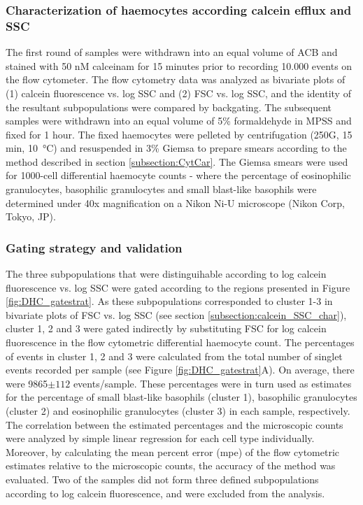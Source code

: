 \subsubsection{Characterization of haemocytes according calcein efflux and SSC}
The first round of samples were withdrawn into an equal volume of ACB and stained with 50 nM \acrshort{calceinam} for 15 minutes prior to recording 10.000 events on the flow cytometer. The flow cytometry data was analyzed as bivariate plots of (1) calcein fluorescence vs. log SSC and (2) FSC vs. log SSC, and the identity of the resultant subpopulations were compared by backgating. The subsequent samples were withdrawn into an equal volume of 5\% formaldehyde in MPSS and fixed for 1 hour. The fixed haemocytes were pelleted by centrifugation (250G, 15 min, \SI{10}{\celsius}) and resuspended in 3\% Giemsa to prepare smears according to the method described in section \ref{subsection:CytCar}. The Giemsa smears were used for 1000-cell differential haemocyte counts - where the percentage of eosinophilic granulocytes, basophilic granulocytes and small blast-like basophils were determined under 40x magnification on a Nikon Ni-U microscope (Nikon Corp, Tokyo, JP).

\subsubsection{Gating strategy and validation}
The three subpopulations that were distinguihable according to log calcein fluorescence vs. log SSC were gated according to the regions presented in Figure \ref{fig:DHC_gatestrat}. As these subpopulations corresponded to cluster 1-3 in bivariate plots of FSC vs. log SSC (see section \ref{subsection:calcein_SSC_char}), cluster 1, 2 and 3 were gated indirectly by substituting FSC for log calcein fluorescence in the flow cytometric differential haemocyte count. The percentages of events in cluster 1, 2 and 3 were calculated from the total number of singlet events recorded per sample (see Figure \ref{fig:DHC_gatestrat}A). On average, there were 9865$\pm{112}$ events/sample. These percentages were in turn used as estimates for the percentage of small blast-like basophils (cluster 1), basophilic granulocytes (cluster 2) and eosinophilic granulocytes (cluster 3) in each sample, respectively. The correlation between the estimated percentages and the microscopic counts were analyzed by simple linear regression for each cell type individually. Moreover, by calculating the mean percent error (\acrshort{mpe}) of the flow cytometric estimates relative to the microscopic counts, the accuracy of the method was evaluated. Two of the samples did not form three defined subpopulations according to log calcein fluorescence, and were excluded from the analysis.

